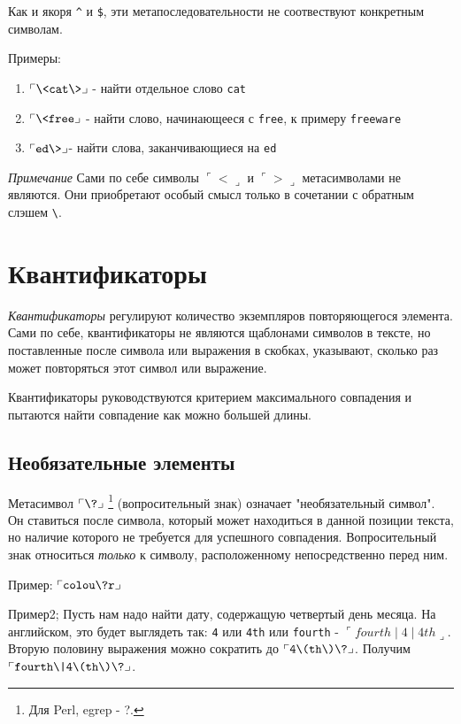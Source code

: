 Как и якоря \verb+^+ и \verb+$+, эти метапоследовательности не соотвествуют конкретным символам.

Примеры:
\begin{enumerate}
\item $\ulcorner \verb=\<cat\>= \lrcorner$ - найти отдельное слово \verb+cat+
\item $\ulcorner \verb=\<free= \lrcorner$ - найти слово, начинающееся с \verb+free+, к примеру \verb+freeware+
\item $\ulcorner \verb=ed\>= \lrcorner$- найти слова, заканчивающиеся на \verb+ed+
\end{enumerate}

\emph{Примечание} Сами по себе символы $\ulcorner < \lrcorner$ и $\ulcorner > \lrcorner$ метасимволами не являются. Они приобретают особый смысл только в сочетании с обратным слэшем \verb+\+.  

\section{Квантификаторы} 

\label{requant}
\emph{Квантификаторы} регулируют количество экземпляров повторяющегося элемента. Сами по себе, квантификаторы не являются щаблонами символов в тексте, но поставленные после символа или выражения в скобках, указывают, сколько раз может повторяться этот символ или выражение.

Квантификаторы руководствуются критерием максимального совпадения и пытаются найти совпадение как можно большей длины.

\subsection{Необязательные элементы}

Метасимвол $\ulcorner \verb+\?+ \lrcorner$ \footnote{Для Perl, egrep - ?.} (вопросительный знак) означает "необязательный символ". Он ставиться после символа, который может находиться в данной позиции текста, но наличие которого не требуется для успешного совпадения. Вопросительный знак относиться \emph{только} к символу, расположенному непосредственно перед ним.

Пример: $\ulcorner \verb+colou\?r+ \lrcorner$  

Пример2; Пусть нам надо найти дату, содержащую четвертый день месяца. На английском, это будет выглядеть так: \verb+4+ или \verb+4th+ или \verb+fourth+ - $\ulcorner fourth\mid 4\mid 4th \lrcorner$. Вторую половину выражения можно сократить до $\ulcorner \verb+4\(th\)\?+ \lrcorner$. Получим $\ulcorner \verb+fourth\|4\(th\)\?+ \lrcorner$.

